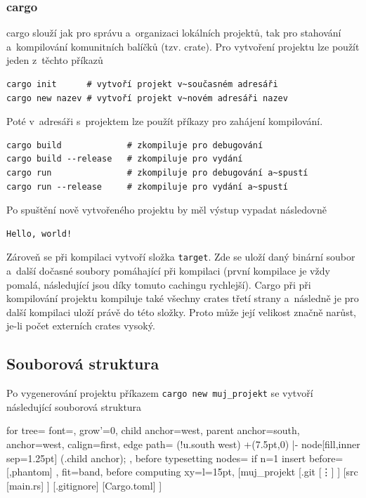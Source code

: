 \documentclass[a4paper, 12pt, twoside]{article} %
\begin{document}
			\subsubsection*{cargo}
				cargo slouží jak pro správu a~organizaci lokálních projektů, tak pro stahování a~kompilování komunitních balíčků (tzv. crate). Pro vytvoření projektu lze použít jeden z~těchto příkazů
				\begin{verbatim}
cargo init      # vytvoří projekt v~současném adresáři
cargo new nazev # vytvoří projekt v~novém adresáři nazev  
					\end{verbatim}
	
				Poté v~adresáři s~projektem lze použít příkazy pro zahájení kompilování.
				\begin{verbatim}
cargo build             # zkompiluje pro debugování
cargo build --release   # zkompiluje pro vydání
cargo run               # zkompiluje pro debugování a~spustí
cargo run --release     # zkompiluje pro vydání a~spustí
				\end{verbatim}
	
				Po spuštění nově vytvořeného projektu by měl výstup vypadat následovně
				\begin{verbatim}
Hello, world!
				\end{verbatim}
	
				Zároveň se při kompilaci vytvoří složka \texttt{target}. Zde se uloží daný binární soubor a~další dočasné soubory pomáhající při kompilaci (první kompilace je vždy pomalá, následující jsou díky tomuto cachingu rychlejší). Cargo při při kompilování projektu kompiluje také všechny crates třetí strany a~následně je pro další kompilaci uloží právě do této složky. Proto může její velikost značně narůst, je-li počet externích crates vysoký.
				
		\subsection{Souborová struktura}
			Po vygenerování projektu příkazem \texttt{cargo new muj\_projekt} se vytvoří následující souborová struktura
			\begin{center}
				\begin{forest}
					for tree={
					font=\ttfamily,
					grow'=0,
					child anchor=west,
					parent anchor=south,
					anchor=west,
					calign=first,
					edge path={
						\noexpand{}
						(!u.south west) +(7.5pt,0) |- node[fill,inner sep=1.25pt] {} (.child anchor);
					},
					before typesetting nodes={
						if n=1
						{insert before={[,phantom]}}
						{}
					},
					fit=band,
					before computing xy={l=15pt},
					}
				[muj\_projekt
					[.git
					[\vdots]
					]
					[src
					[main.rs]
					]
					[.gitignore]
					[Cargo.toml]
				]
				\end{forest}
			\end{center}
		
\end{document}
